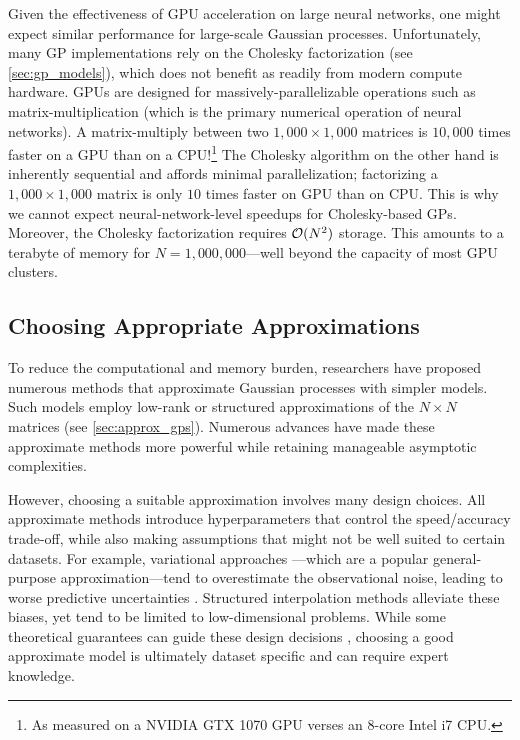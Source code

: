 Given the effectiveness of GPU acceleration on large neural networks, one might expect similar performance for large-scale Gaussian processes.
Unfortunately, many GP implementations rely on the Cholesky factorization (see \cref{sec:gp_models}), which does not benefit as readily from modern compute hardware.
GPUs are designed for massively-parallelizable operations such as matrix-multiplication (which is the primary numerical operation of neural networks).
A matrix-multiply between two $1,\!000 \times 1,\!000$ matrices is $10,\!000$ times faster on a GPU than on a CPU!\footnote{
	As measured on a NVIDIA GTX 1070 GPU verses an 8-core Intel i7 CPU.
}
The Cholesky algorithm on the other hand is inherently sequential and affords minimal parallelization;
factorizing a $1,\!000 \times 1,\!000$ matrix is only $10$ times faster on GPU than on CPU.
This is why we cannot expect neural-network-level speedups for Cholesky-based GPs.
Moreover, the Cholesky factorization requires $\bigo{N^2}$ storage.
This amounts to a terabyte of memory for $N=1,\!000,\!000$---well beyond the capacity of most GPU clusters.

\subsection{Choosing Appropriate Approximations}
To reduce the computational and memory burden, researchers have proposed numerous methods that approximate Gaussian processes with simpler models.
Such models employ low-rank or structured approximations of the $N \times N$ matrices (see \cref{sec:approx_gps}).
Numerous advances have made these approximate methods more powerful while retaining manageable asymptotic complexities.

However, choosing a suitable approximation involves many design choices.
All approximate methods introduce hyperparameters that control the speed/accuracy trade-off, while also making assumptions that might not be well suited to certain datasets.
For example, variational approaches \citep[e.g.][]{titsias2009variational,hensman2013gaussian}---which are a popular general-purpose approximation---tend to overestimate the observational noise, leading to worse predictive uncertainties \cite{turner2011two,bauer2016understanding}.
Structured interpolation methods \cite{wilson2015kernel} alleviate these biases, yet tend to be limited to low-dimensional problems.
While some theoretical guarantees can guide these design decisions \cite{burt2019rates}, choosing a good approximate model is ultimately dataset specific and can require expert knowledge.

